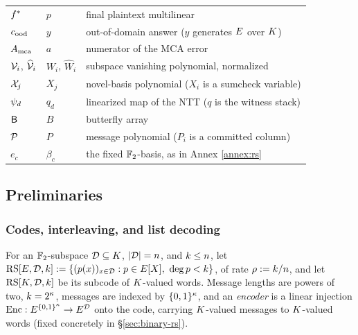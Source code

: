 \begin{center}
\begin{tabular}{@{}lll@{}}
$f^{\ast}$      & $p$          & final plaintext multilinear\\
$c_{\mathrm{ood}}$        & $y$          & out-of-domain answer ($y$ generates $E$ over $K$)\\
$A_{\mathrm{mca}}$      & $a$          & numerator of the MCA error\\
$\mathcal{V}_i$, $\widehat{\mathcal{V}}_{i}$ & $W_i$, $\widehat W_i$ & subspace vanishing polynomial, normalized\\
$\mathcal{X}_j$     & $X_j$        & novel-basis polynomial ($X_i$ is a sumcheck variable)\\
$\psi_d$     & $q_d$        & linearized map of the NTT ($q$ is the witness stack)\\
$\mathsf{B}$       & $B$          & butterfly array\\
$\mathcal{P}$       & $P$          & message polynomial ($P_i$ is a committed column)\\
$e_c$          & $\beta_c$    & the fixed $\mathbb{F}_2$-basis, as in Annex \ref{annex:rs}\\
\hline
\end{tabular}
\end{center}

\subsection{Preliminaries}\label{sec:prelims}

\subsubsection{Codes, interleaving, and list decoding}\label{sec:codes}

For an $\mathbb{F}_2$-subspace $\mathcal{D} \subseteq K$, $|\mathcal{D}| = n$, and $k \le n$, let $\mathrm{RS}[E, \mathcal{D}, k] := \{ (p(x))_{x \in \mathcal{D}} : p \in E[X],\ \deg p < k \}$, of rate $\rho := k/n$, and let $\mathrm{RS}[K, \mathcal{D}, k]$ be its subcode of $K$-valued words. Message lengths are powers of two, $k = 2^{\kappa}$, messages are indexed by $\{0,1\}^{\kappa}$, and an \emph{encoder} is a linear injection $\mathrm{Enc} : E^{\{0,1\}^{\kappa}} \to E^{\mathcal{D}}$ onto the code, carrying $K$-valued messages to $K$-valued words (fixed concretely in \S\ref{sec:binary-rs}).


